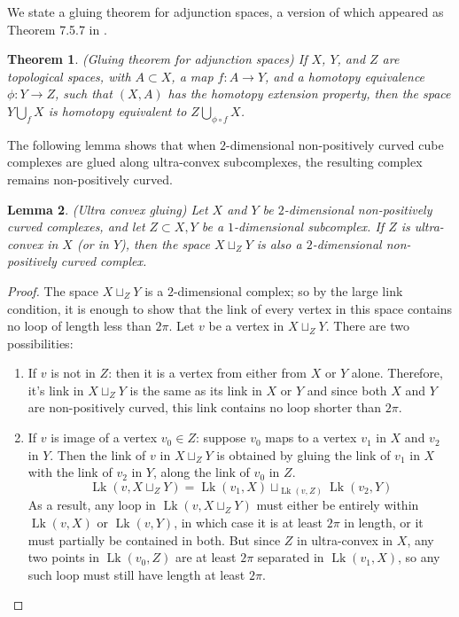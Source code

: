 \documentclass[oneside,11pt,reqno]{amsart}
\newtheorem{thm}{Theorem}[section]
\newtheorem{lem}[thm]{Lemma}
\theoremstyle{definition}
\DeclareMathOperator{\Lk}{Lk}
\begin{document}
We state a gluing theorem for adjunction spaces, a version of which appeared as Theorem 7.5.7 in \cite{brown}.

\begin{thm}\label{algtopo} (Gluing theorem for adjunction spaces)
If $X$, $Y$, and $Z$ are topological spaces, with $A \subset X$, a map $f : A \rightarrow Y$, and a homotopy equivalence $\phi : Y \rightarrow Z$, such that $(X,A)$ has the homotopy extension property, then the space $Y \bigcup_f X$ is homotopy equivalent to $Z \bigcup_{\phi \circ f} X$.
\end{thm}

The following lemma shows that when $2$-dimensional non-positively curved cube complexes are glued along ultra-convex subcomplexes, the resulting complex remains non-positively curved.

\begin{lem}\label{ultra convexity chaining} (Ultra convex gluing)
    Let $X$ and $Y$ be $2$-dimensional non-positively curved complexes, and let $Z \subset X, Y$ be a $1$-dimensional subcomplex. If $Z$ is ultra-convex in $X$ (or in $Y$), then the space $ X\sqcup_ZY$ is also a $2$-dimensional non-positively curved complex.
\end{lem}
\begin{proof}
The space $X\sqcup_ZY$ is a $2$-dimensional complex; so by the large link condition, it is enough to show that the link of every vertex in this space contains no loop of length less than $2\pi$. 
Let $v$ be a vertex in $X\sqcup_ZY$. There are two possibilities: 
\begin{enumerate}

    \item  If $v$ is not in $Z$: then it is a vertex from either from $X$ or $Y$ alone. Therefore,  it's link in $X\sqcup_ZY$ is the same as its link in $X$ or $Y$  and since both $X$ and $Y$ are non-positively curved, this link contains no loop shorter than $2\pi$. 
    \item If $v$ is image of a vertex $v_0 \in Z$: suppose $v_0$ maps to a vertex $v_1$ in $X$ and $v_2$ in $Y$. Then the link of $v$ in $X\sqcup_ZY$ is obtained by gluing the link of $v_1$ in $X$ with the link of $v_2$ in $Y$, along the link of $v_0$ in $Z$.
$$\Lk(v, X\sqcup_ZY) = \Lk(v_1, X) \sqcup_{\Lk(v, Z)} \Lk(v_2, Y)$$ 
As a result, any loop in $\Lk(v, X\sqcup_ZY)$ must either be entirely within $\Lk(v, X)$ or $\Lk(v, Y)$, in which case it is at least $2\pi$ in length, or it must partially be contained in both. But since $Z$ in ultra-convex in $X$, any two points in $\Lk(v_0, Z)$ are at least $2\pi$ separated in $\Lk(v_1, X)$, so any such loop must still have length at least $2\pi$. 
   \end{enumerate}
    
    \end{proof}
\end{document}
